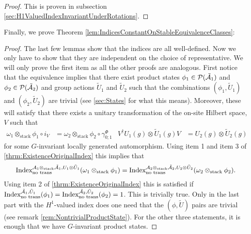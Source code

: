 \documentclass[11pt,a4paper,twoside]{article}
\numberwithin{equation}{section}
\begin{document}
	\begin{proof}
		This is proven in subsection \ref{sec:H1ValuedIndexInvariantUnderRotations}.
	\end{proof}
	Finally, we prove Theorem \ref{lem:IndicesConstantOnStableEquivalenceClasses}:
	\begin{proof}
		The last few lemmas show that the indices are all well-defined. Now we only have to show that they are independent on the choice of representative.	We will only prove the first item as all the other proofs are analogous. First notice that the equivalence implies that there exist product states $\phi_1\in\PP(\tilde\AA_1)$ and $\phi_2\in\PP(\tilde\AA_2)$ and group actions $\tilde U_1$ and $\tilde U_2$ such that the combinations $(\phi_1,\tilde U_1)$ and $(\phi_2,\tilde U_2)$ are trivial (see \ref{sec:States} for what this means). Moreover, these will satisfy that there exists a unitary transformation of the on-site Hilbert space, $V$ such that
		\begin{align}
			\omega_1\otimes_{\text{stack}}\phi_1\circ i_V&=\omega_2\otimes_{\text{stack}}\phi_2\circ\gamma^\Phi_{0;1}&V^\dagger U_{1}(g)\otimes \tilde{U}_{1}(g)V&=U_{2}(g)\otimes \tilde{U}_{2}(g)
		\end{align}
		for some $G$-invariant locally generated automorphism. Using item 1 and item 3 of \ref{thrm:ExistenceOriginalIndex} this implies that
		\begin{equation}
			\textrm{Index}^{\AA_1\otimes_{\text{stack}}\tilde \AA_1,U_1\otimes \tilde U_1}_{\text{no trans}}(\omega_1\otimes_{\text{stack}}\phi_1) =\textrm{Index}^{\AA_2\otimes_{\text{stack}}\tilde \AA_2,U_2\otimes\tilde U_2}_{\text{no trans}}(\omega_2\otimes_{\text{stack}}\phi_2).
		\end{equation}
		Using item 2 of \ref{thrm:ExistenceOriginalIndex} this is satisfied if $\textrm{Index}^{\tilde \AA_1,\tilde U_1}_{\text{no trans}}(\phi_1)=\textrm{Index}^{\tilde \AA_2,\tilde U_2}_{\text{no trans}}(\phi_2)=1$. This is trivially true. Only in the last part with the $H^1$-valued index does one need that the $(\phi,\tilde U)$ pairs are trivial (see remark \ref{rem:NontrivialProductState}). For the other three statements, it is enough that we have $G$-invariant product states.
	\end{proof}
	
\end{document}
